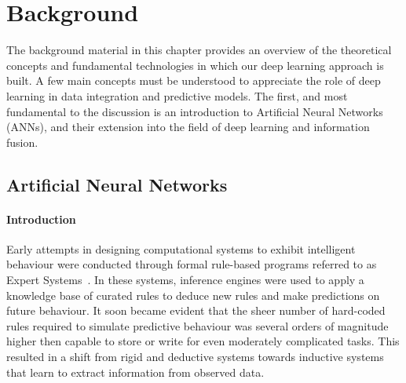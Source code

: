 \chapter{Background}\label{chap:background}

The background material in this chapter provides an overview of the theoretical concepts and fundamental technologies in which our deep learning approach is built. A few main concepts must be understood to appreciate the role of deep learning in data integration and predictive models. The first, and most fundamental to the discussion is an introduction to Artificial Neural Networks (ANNs), and their extension into the field of deep learning and information fusion. 

\section{Artificial Neural Networks}\label{sec:ann}
\subsubsection{Introduction}

Early attempts in designing computational systems to exhibit intelligent behaviour were conducted through formal rule-based programs referred to as Expert Systems~\cite{weiss1991computer}. In these systems, inference engines were used to apply a knowledge base of curated rules to deduce new rules and make predictions on future behaviour. It soon became evident that the sheer number of hard-coded rules required to simulate predictive behaviour was several orders of magnitude higher then capable to store or write for even moderately complicated tasks. This resulted in a shift from rigid and deductive systems towards inductive systems that learn to extract information from observed data. 

 
